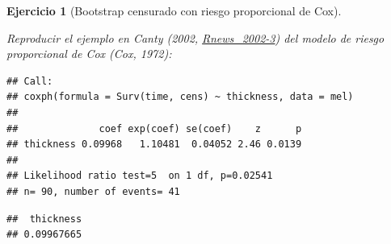 \documentclass[
]{book}
\newenvironment{Shaded}{\begin{snugshade}}{\end{snugshade}}
\newcommand{\AttributeTok}[1]{\textcolor[rgb]{0.13,0.29,0.53}{#1}}
\newcommand{\CommentTok}[1]{\textcolor[rgb]{0.56,0.35,0.01}{\textit{#1}}}
\newcommand{\DecValTok}[1]{\textcolor[rgb]{0.00,0.00,0.81}{#1}}
\newcommand{\FunctionTok}[1]{\textcolor[rgb]{0.13,0.29,0.53}{\textbf{#1}}}
\newcommand{\NormalTok}[1]{#1}
\newcommand{\OtherTok}[1]{\textcolor[rgb]{0.56,0.35,0.01}{#1}}
\newcommand{\SpecialCharTok}[1]{\textcolor[rgb]{0.81,0.36,0.00}{\textbf{#1}}}
\theoremstyle{break}
\newtheorem{exercise}{Ejercicio}[chapter]
\theoremstyle{nonumberplain}
\renewcommand{\CommentTok}[1]{\textcolor[rgb]{0.41,0.41,0.41}{\texttt{#1}}}
\begin{document}
\begin{exercise}[Bootstrap censurado con riesgo proporcional de Cox]
\protect\hypertarget{exr:censboot-cox-ej}{}\label{exr:censboot-cox-ej}

Reproducir el ejemplo en Canty (2002, \href{https://www.r-project.org/doc/Rnews/Rnews_2002-3.pdf}{Rnews\_2002-3}) del modelo de riesgo proporcional de Cox (Cox, 1972):

\begin{Shaded}
\end{Shaded}

\begin{verbatim}
## Call:
## coxph(formula = Surv(time, cens) ~ thickness, data = mel)
## 
##              coef exp(coef) se(coef)    z      p
## thickness 0.09968   1.10481  0.04052 2.46 0.0139
## 
## Likelihood ratio test=5  on 1 df, p=0.02541
## n= 90, number of events= 41
\end{verbatim}

\begin{Shaded}
\end{Shaded}

\begin{verbatim}
##  thickness 
## 0.09967665
\end{verbatim}

\end{exercise}
\end{document}
